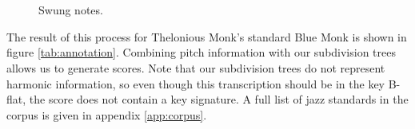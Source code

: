 \begin{figure}
\centering
{}
\\
\\
\caption{Swung notes.}
\label{fig:swing}
\end{figure}

The result of this process for Thelonious Monk's standard Blue Monk is shown in figure \ref{tab:annotation}. Combining pitch information with our subdivision trees allows us to generate scores. Note that our subdivision trees do not represent harmonic information, so even though this transcription should be in the key B-flat, the score does not contain a key signature. A full list of jazz standards in the corpus is given in appendix \ref{app:corpus}.

